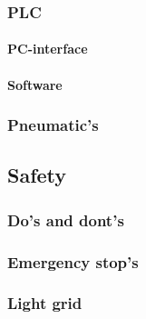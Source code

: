 \documentclass{article}
\begin{document}
        \subsubsection{PLC}
        \paragraph{PC-interface}
        \paragraph{Software}
        \subsubsection{Pneumatic's}
    
    \subsection{Safety}
        \subsubsection{Do's and dont's }
        \subsubsection{Emergency stop's}
        \subsubsection{Light grid}
\end{document}
